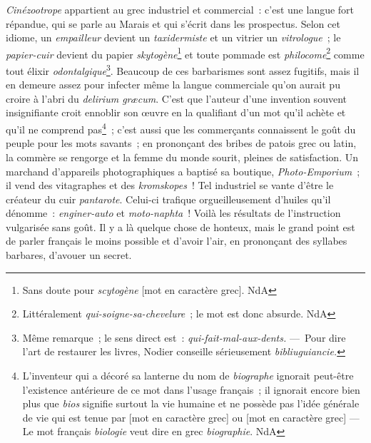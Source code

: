 \documentclass[french,twoside]{book} %
\begin{document}
{\itshape Cinézootrope} appartient au grec industriel et commercial : c’est une langue fort répandue, qui se parle au Marais et qui s’écrit dans les prospectus. Selon cet idiome, un {\itshape empailleur} devient un {\itshape taxidermiste} et un vitrier un {\itshape vitrologue} ; le {\itshape papier-cuir} devient du papier {\itshape skytogène}\footnote{Sans doute pour {\itshape scytogène} [mot en caractère grec]. NdA} et toute pommade est {\itshape philocome}\footnote{Littéralement {\itshape qui-soigne-sa-chevelure} ; le mot est donc absurde. NdA} comme tout élixir {\itshape odontalgique}\footnote{Même remarque ; le sens direct est : {\itshape qui-fait-mal-aux-dents.} — Pour dire l’art de restaurer les livres, Nodier conseille sérieusement {\itshape bibliuguiancie.}}. Beaucoup de ces barbarismes sont assez fugitifs, mais il en demeure assez pour infecter même la langue commerciale qu’on aurait pu croire à l’abri du {\itshape delirium græcum}. C’est que l’auteur d’une invention souvent insignifiante croit ennoblir son œuvre en la qualifiant d’un mot qu’il achète et qu’il ne comprend pas\footnote{L’inventeur qui a décoré sa lanterne du nom de {\itshape biographe} ignorait peut-être l’existence antérieure de ce mot dans l’usage français ; il ignorait encore bien plus que {\itshape bios} signifie surtout la vie humaine et ne possède pas l’idée générale de vie qui est tenue par [mot en caractère grec] ou [mot en caractère grec] — Le mot français {\itshape biologie} veut dire en grec {\itshape biographie}. NdA} ; c’est aussi que les commerçants connaissent le goût du peuple pour les mots savants ; en prononçant des bribes de patois grec ou latin, la commère se rengorge et la femme du monde sourit, pleines de satisfaction. Un marchand d’appareils photographiques a baptisé sa boutique, {\itshape Photo-Emporium} ; il vend des vitagraphes et des {\itshape kromskopes} ! Tel industriel se vante d’être le créateur du cuir {\itshape pantarote}. Celui-ci trafique orgueilleusement d’huiles qu’il dénomme : {\itshape enginer-auto} et {\itshape moto-naphta} ! Voilà les résultats de l’instruction vulgarisée sans goût. Il y a là quelque chose de honteux, mais le grand point est de parler français le moins possible et d’avoir l’air, en prononçant des syllabes barbares, d’avouer un secret.\par
\end{document}
